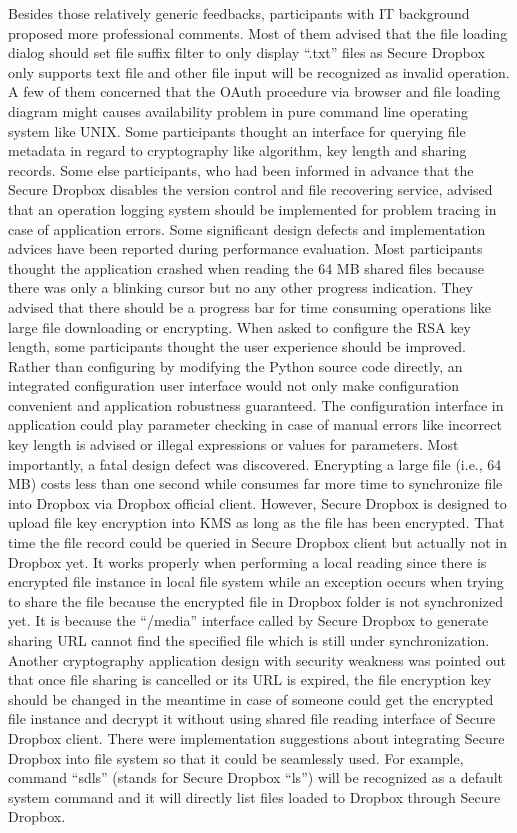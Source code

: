 Besides those relatively generic feedbacks, participants with IT background proposed more professional comments. Most of them advised that the file loading dialog should set file suffix filter to only display ``.txt'' files as Secure Dropbox only supports text file and other file input will be recognized as invalid operation. A few of them concerned that the OAuth procedure via browser and file loading diagram might causes availability problem in pure command line operating system like UNIX. Some participants thought an interface for querying file metadata in regard to cryptography like algorithm, key length and sharing records. Some else participants, who had been informed in advance that the Secure Dropbox disables the version control and file recovering service, advised that an operation logging system should be implemented for problem tracing in case of application errors. Some significant design defects and implementation advices have been reported during performance evaluation. Most participants thought the application crashed when reading the 64 MB shared files because there was only a blinking cursor but no any other progress indication. They advised that there should be a progress bar for time consuming operations like large file downloading or encrypting. When asked to configure the RSA key length, some participants thought the user experience should be improved. Rather than configuring by modifying the Python source code directly, an integrated configuration user interface would not only make configuration convenient and application robustness guaranteed. The configuration interface in application could play parameter checking in case of manual errors like incorrect key length is advised or illegal expressions or values for parameters. Most importantly, a fatal design defect was discovered. Encrypting a large file (i.e., 64 MB) costs less than one second while consumes far more time to synchronize file into Dropbox via Dropbox official client. However, Secure Dropbox is designed to upload file key encryption into KMS as long as the file has been encrypted. That time the file record could be queried in Secure Dropbox client but actually not in Dropbox yet. It works properly when performing a local reading since there is encrypted file instance in local file system while an exception occurs when trying to share the file because the encrypted file in Dropbox folder is not synchronized yet. It is because the “/media” interface called by Secure Dropbox to generate sharing URL cannot find the specified file which is still under synchronization. Another cryptography application design with security weakness was pointed out that once file sharing is cancelled or its URL is expired, the file encryption key should be changed in the meantime in case of someone could get the encrypted file instance and decrypt it without using shared file reading interface of Secure Dropbox client. There were implementation suggestions about integrating Secure Dropbox into file system so that it could be seamlessly used. For example, command ``sdls'' (stands for Secure Dropbox ``ls'') will be recognized as a default system command and it will directly list files loaded to Dropbox through Secure Dropbox.

